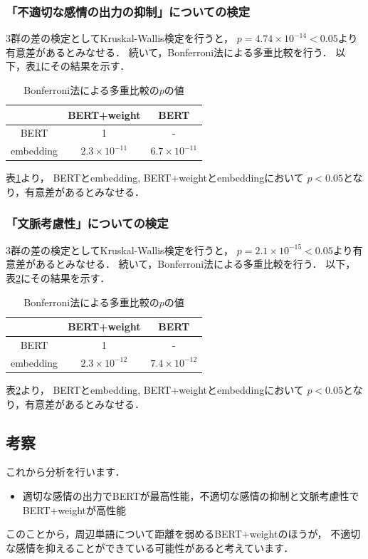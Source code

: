 	\subsubsection{「不適切な感情の出力の抑制」についての検定}
		3群の差の検定としてKruskal-Wallis検定を行うと，
		$p=4.74\times10^{-14}<0.05$より有意差があるとみなせる．
		続いて，Bonferroni法による多重比較を行う．
		以下，表\ref{table:jikken2_bad_Bonferroni}にその結果を示す．
		\begin{table}[H]
			\centering
			\caption{Bonferroni法による多重比較の$p$の値}
			\label{table:jikken2_bad_Bonferroni}
			\begin{tabular}{|c|c|c|}
				\hline
				& BERT+weight & BERT \\
				\hline
				BERT & 1 & - \\
				\hline
				embedding & $2.3\times10^{-11}$ & $6.7\times10^{-11}$ \\
				\hline
			\end{tabular}
		\end{table}
		表\ref{table:jikken2_bad_Bonferroni}より，
		BERTとembedding, BERT+weightとembeddingにおいて
		$p<0.05$となり，有意差があるとみなせる．
	\subsubsection{「文脈考慮性」についての検定}
		3群の差の検定としてKruskal-Wallis検定を行うと，
		$p=2.1\times10^{-15}<0.05$より有意差があるとみなせる．
		続いて，Bonferroni法による多重比較を行う．
		以下，表\ref{table:jikken2_context_Bonferroni}にその結果を示す．
		\begin{table}[H]
			\centering
			\caption{Bonferroni法による多重比較の$p$の値}
			\label{table:jikken2_context_Bonferroni}
			\begin{tabular}{|c|c|c|}
				\hline
				& BERT+weight & BERT \\
				\hline
				BERT & 1 & - \\
				\hline
				embedding & $2.3\times10^{-12}$ & $7.4\times10^{-12}$ \\
				\hline
			\end{tabular}
		\end{table}
		表\ref{table:jikken2_context_Bonferroni}より，
		BERTとembedding, BERT+weightとembeddingにおいて
		$p<0.05$となり，有意差があるとみなせる．

	\subsection{考察}
	これから分析を行います．
	\begin{itemize}
		\item 適切な感情の出力でBERTが最高性能，不適切な感情の抑制と文脈考慮性でBERT+weightが高性能
	\end{itemize}
	このことから，周辺単語について距離を弱めるBERT+weightのほうが，
	不適切な感情を抑えることができている可能性があると考えています．

